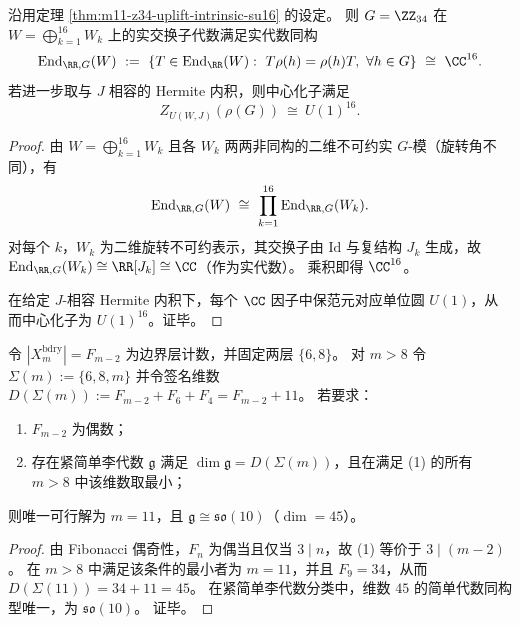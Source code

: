 \begin{proposition}\label{prop:m11-z34-commutant-u1-16}
沿用定理 \ref{thm:m11-z34-uplift-intrinsic-su16} 的设定。
则 \(G=\ZZ_{34}\) 在 \(W=\bigoplus_{k=1}^{16}W_k\) 上的实交换子代数满足实代数同构
\[
\mathrm{End}_{\RR,G}(W)\ :=\ \{T\in \mathrm{End}_{\RR}(W):\ T\rho(h)=\rho(h)T,\ \forall h\in G\}
\ \cong\ \CC^{16}.
\]
若进一步取与 \(J\) 相容的 Hermite 内积，则中心化子满足
\[
Z_{U(W,J)}(\rho(G))\ \cong\ U(1)^{16}.
\]
\end{proposition}
\begin{proof}
由 \(W=\bigoplus_{k=1}^{16}W_k\) 且各 \(W_k\) 两两非同构的二维不可约实 \(G\)-模（旋转角不同），有
\[
\mathrm{End}_{\RR,G}(W)\ \cong\ \prod_{k=1}^{16}\mathrm{End}_{\RR,G}(W_k).
\]
对每个 \(k\)，\(W_k\) 为二维旋转不可约表示，其交换子由 \(\mathrm{Id}\) 与复结构 \(J_k\) 生成，故 \(\mathrm{End}_{\RR,G}(W_k)\cong \RR[J_k]\cong \CC\)（作为实代数）。
乘积即得 \(\CC^{16}\)。
\par
在给定 \(J\)-相容 Hermite 内积下，每个 \(\CC\) 因子中保范元对应单位圆 \(U(1)\)，从而中心化子为 \(U(1)^{16}\)。证毕。
\end{proof}

\begin{theorem}[偶边界与单层替换约束下的极小简单解：\texorpdfstring{$m=11$}{m=11} 与 \texorpdfstring{$\mathfrak{so}(10)$}{so(10)}]\label{thm:bdry-even-single-layer-minimal-so10}
令 \(|X_m^{\mathrm{bdry}}|=F_{m-2}\) 为边界层计数，并固定两层 \(\{6,8\}\)。
对 \(m>8\) 令
\(
\Sigma(m):=\{6,8,m\}
\)
并令签名维数
\(
D(\Sigma(m)):=F_{m-2}+F_{6}+F_{4}=F_{m-2}+11
\)。
若要求：
\begin{enumerate}
  \item \(F_{m-2}\) 为偶数；
  \item 存在紧简单李代数 \(\mathfrak g\) 满足 \(\dim\mathfrak g=D(\Sigma(m))\)，且在满足 (1) 的所有 \(m>8\) 中该维数取最小；
\end{enumerate}
则唯一可行解为 \(m=11\)，且 \(\mathfrak g\cong \mathfrak{so}(10)\)（\(\dim=45\)）。
\end{theorem}
\begin{proof}
由 Fibonacci 偶奇性，\(F_n\) 为偶当且仅当 \(3\mid n\)，故 (1) 等价于 \(3\mid (m-2)\)。
在 \(m>8\) 中满足该条件的最小者为 \(m=11\)，并且 \(F_{9}=34\)，从而
\(
D(\Sigma(11))=34+11=45
\)。
在紧简单李代数分类中，维数 \(45\) 的简单代数同构型唯一，为 \(\mathfrak{so}(10)\)。
证毕。
\end{proof}

